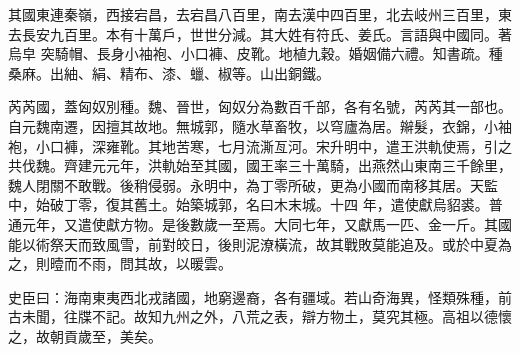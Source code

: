 \begin{pinyinscope}
 其國東連秦嶺，西接宕昌，去宕昌八百里，南去漢中四百里，北去岐州三百里，東去長安九百里。本有十萬戶，世世分減。其大姓有符氏、姜氏。言語與中國同。著烏皁
 突騎帽、長身小袖袍、小口褲、皮靴。地植九穀。婚姻備六禮。知書疏。種桑麻。出紬、絹、精布、漆、蠟、椒等。山出銅鐵。



 芮芮國，蓋匈奴別種。魏、晉世，匈奴分為數百千部，各有名號，芮芮其一部也。自元魏南遷，因擅其故地。無城郭，隨水草畜牧，以穹廬為居。辮髮，衣錦，小袖袍，小口褲，深雍靴。其地苦寒，七月流澌亙河。宋升明中，遣王洪軌使焉，引之共伐魏。齊建元元年，洪軌始至其國，國王率三十萬騎，出燕然山東南三千餘里，魏人閉關不敢戰。後稍侵弱。永明中，為丁零所破，更為小國而南移其居。天監中，始破丁零，復其舊土。始築城郭，名曰木末城。十四
 年，遣使獻烏貂裘。普通元年，又遣使獻方物。是後數歲一至焉。大同七年，又獻馬一匹、金一斤。其國能以術祭天而致風雪，前對皎日，後則泥潦橫流，故其戰敗莫能追及。或於中夏為之，則曀而不雨，問其故，以暖雲。



 史臣曰：海南東夷西北戎諸國，地窮邊裔，各有疆域。若山奇海異，怪類殊種，前古未聞，往牒不記。故知九州之外，八荒之表，辯方物土，莫究其極。高祖以德懷之，故朝貢歲至，美矣。



\end{pinyinscope}